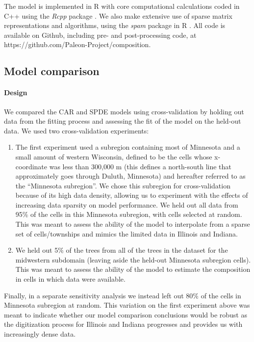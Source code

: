 \documentclass[10pt,letterpaper]{article}
\begin{document}
The model is implemented in R \cite{R:2014} with core computational
calculations coded in C++ using the \emph{Rcpp} package \cite{Edde:Fran:2011}.
We also make extensive use of sparse matrix representations and algorithms,
using the \emph{spam} package in R \cite{Furr:Sain:2010}. All code
is available on Github, including pre- and post-processing code, at
https://github.com/Paleon-Project/composition. 


\subsection*{Model comparison\label{sec:Model-comparison}}


\paragraph*{Design}

We compared the CAR and SPDE models using cross-validation by holding
out data from the fitting process and assessing the fit of the model
on the held-out data. We used two cross-validation experiments:
\begin{enumerate}
\item The first experiment used a subregion containing most of Minnesota
and a small amount of western Wisconsin, defined to be the cells whose
x-coordinate was less than 300,000 m (this defines a north-south line
that approximately goes through Duluth, Minnesota) and hereafter referred
to as the ``Minnesota subregion''. We chose this subregion for cross-validation
because of its high data density, allowing us to experiment with the
effects of increasing data sparsity on model performance. We held
out all data from 95\% of the cells in this Minnesota subregion, with
cells selected at random. This was meant to assess the ability of
the model to interpolate from a sparse set of cells/townships and
mimics the limited data in Illinois and Indiana.
\item We held out 5\% of the trees from all of the trees in the dataset
for the midwestern subdomain (leaving aside the held-out Minnesota
subregion cells). This was meant to assess the ability of the model
to estimate the composition in cells in which data were available. 
\end{enumerate}
Finally, in a separate sensitivity analysis we instead left out 80\%
of the cells in Minnesota subregion at random. This variation on the
first experiment above was meant to indicate whether our model comparison
conclusions would be robust as the digitization process for Illinois
and Indiana progresses and provides us with increasingly dense data. 
\end{document}
